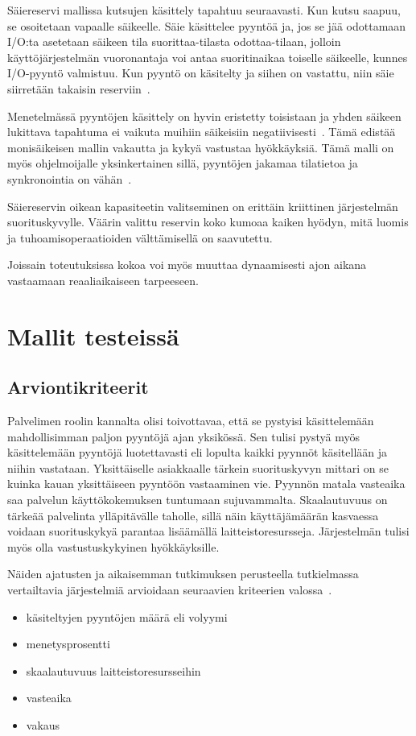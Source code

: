 \documentclass[12pt]{article}
\begin{document}
Säiereservi mallissa kutsujen käsittely tapahtuu seuraavasti.
Kun kutsu saapuu, se osoitetaan vapaalle säikeelle. Säie käsittelee pyyntöä ja,
jos se jää odottamaan I/O:ta asetetaan säikeen tila suorittaa-tilasta odottaa-tilaan,
jolloin käyttöjärjestelmän vuoronantaja voi antaa suoritinaikaa toiselle säikeelle,
kunnes I/O-pyyntö valmistuu. Kun pyyntö on käsitelty ja siihen on vastattu, niin
säie siirretään takaisin reserviin~\cite{ling_analysis_2000}.

Menetelmässä pyyntöjen käsittely on hyvin eristetty toisistaan ja
yhden säikeen lukittava tapahtuma ei vaikuta muihiin säikeisiin negatiivisesti~\cite{davis_case_2017}.
Tämä edistää monisäikeisen mallin vakautta ja kykyä vastustaa hyökkäyksiä.
Tämä malli on myös ohjelmoijalle yksinkertainen sillä, pyyntöjen jakamaa tilatietoa
ja synkronointia on vähän~\cite{hu_applying_1998}.

Säiereservin oikean kapasiteetin valitseminen on erittäin kriittinen 
järjestelmän suorituskyvylle.
Väärin valittu reservin koko kumoaa kaiken hyödyn, mitä luomis
ja tuhoamisoperaatioiden välttämisellä on saavutettu.

Joissain toteutuksissa kokoa voi myös muuttaa dynaamisesti ajon aikana vastaamaan
reaaliaikaiseen tarpeeseen.

\section{Mallit testeissä}
\subsection{Arviontikriteerit}
Palvelimen roolin kannalta olisi toivottavaa, että
se pystyisi käsittelemään mahdollisimman paljon pyyntöjä
ajan yksikössä. Sen tulisi pystyä myös käsittelemään pyyntöjä
luotettavasti eli lopulta kaikki pyynnöt käsitellään ja niihin vastataan.
Yksittäiselle asiakkaalle tärkein suorituskyvyn mittari on se kuinka kauan
yksittäiseen pyyntöön vastaaminen vie. Pyynnön matala vasteaika saa
palvelun käyttökokemuksen tuntumaan sujuvammalta.
Skaalautuvuus on tärkeää palvelinta ylläpitävälle taholle, sillä
näin käyttäjämäärän kasvaessa voidaan suorituskykyä parantaa
lisäämällä laitteistoresursseja. Järjestelmän tulisi myös
olla vastustuskykyinen hyökkäyksille.

Näiden ajatusten ja aikaisemman tutkimuksen perusteella
tutkielmassa vertailtavia järjestelmiä arvioidaan seuraavien
kriteerien valossa~\cite{gokhale_performance_2006}.
\begin{itemize}
    \item käsiteltyjen pyyntöjen määrä eli volyymi
    \item menetysprosentti
    \item skaalautuvuus laitteistoresursseihin
    \item vasteaika
    \item vakaus
\end{itemize}
\end{document}
